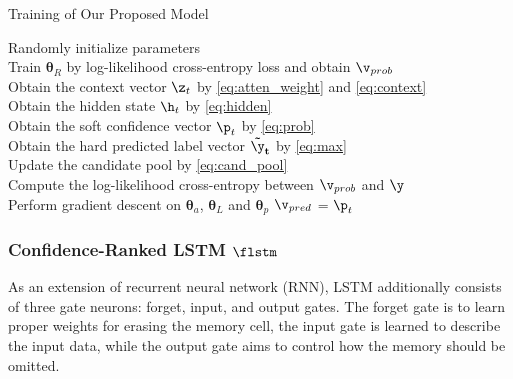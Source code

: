 \documentclass[letterpaper]{article} %
\begin{document}
{\color{blue}
\begin{algorithm}[t]
	\label{alg:training}
	\DontPrintSemicolon
	\caption{Training of Our Proposed Model}

    \BlankLine
	Randomly initialize parameters\\
    Train $\mathbf{\theta}_R$ by log-likelihood cross-entropy loss and obtain $\mathbf{\v}_{prob}$\\
	{
        {
        	Obtain the context vector $\mathbf{\z}_t$ by \eqref{eq:atten_weight} and \eqref{eq:context}\\
            Obtain the hidden state $\mathbf{\h}_t$ by \eqref{eq:hidden}\\
            Obtain the soft confidence vector $\mathbf{\p}_t$ by \eqref{eq:prob}\\
            Obtain the hard predicted label vector $\mathbf{\tilde{\y}_t}$ by \eqref{eq:max}\\
            Update the candidate pool by \eqref{eq:cand_pool}\\
            Compute the log-likelihood cross-entropy between $\mathbf{\v}_{prob}$ and $\mathbf{\y}$\\
            Perform gradient descent on $\mathbf{\theta}_a$, $\mathbf{\theta}_L$ and $\mathbf{\theta}_p$
            $\mathbf{\v}_{pred}$ = $\mathbf{\p}_t$
        }
    }
\end{algorithm}
} 

\subsubsection{Confidence-Ranked LSTM $\flstm$}
\label{LSTM}
As an extension of recurrent neural network (RNN), LSTM additionally consists of three gate neurons: forget, input, and output gates. The forget gate is to learn proper weights for erasing the memory cell, the input gate is learned to describe the input data, while the output gate aims to control how the memory should be omitted.
\end{document}
